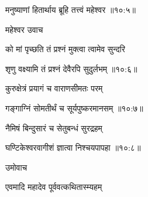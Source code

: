 {\devanagarifont मनुष्याणां हितार्थाय ब्रूहि तत्त्वं महेश्वर {॥१०:५॥} \veg\dontdisplaylinenum }%

{\devanagarifont महेश्वर उवाच {\dandab}\dontdisplaylinenum  }%
 
{\devanagarifont को मां पृच्छति तं प्रश्नं मुक्त्वा त्वामेव सुन्दरि \thinspace{\danda} \dontdisplaylinenum }%


{\devanagarifont शृणु वक्ष्यामि तं प्रश्नं देवैरपि सुदुर्लभम् {॥१०:६॥} \veg\dontdisplaylinenum }%

{\devanagarifont कुरुक्षेत्रं प्रयागं च वाराणसीमतः परम् \thinspace{\dandab} \dontdisplaylinenum }%
 

{\devanagarifont गङ्गाग्निं सोमतीर्थं च सूर्यपुष्करमानसम् {॥१०:७॥} \veg\dontdisplaylinenum }%

{\devanagarifont नैमिषं बिन्दुसारं च सेतुबन्धं सुरद्रहम् \thinspace{\dandab} \dontdisplaylinenum }%


{\devanagarifont घण्टिकेश्वरवागीशं ज्ञात्वा निश्चयपापहा {॥१०:८॥} \veg\dontdisplaylinenum }%

{\devanagarifont उमोवाच {\dandab}\dontdisplaylinenum  }%
 
{\devanagarifont एवमादि महादेव पूर्ववत्कथितास्म्यहम् \thinspace{\danda} \dontdisplaylinenum }%

